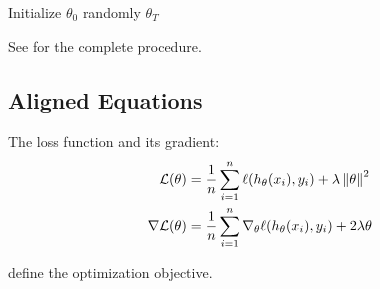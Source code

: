 \begin{algorithm}[H]
\caption{Gradient Descent for Empirical Risk Minimization}
\label{alg:gd}
Initialize $\theta_0$ randomly\;
\Return $\theta_T$\;
\end{algorithm}

See  for the complete procedure.

\subsection{Aligned Equations}

The loss function and its gradient:
\begin{align}
\mathcal{L}(\theta) &= \frac{1}{n} \sum_{i=1}^{n} \ell(h_\theta(x_i), y_i) + \lambda \left\lVert\theta\right\rVert^2 \label{eq:loss} \\
\nabla \mathcal{L}(\theta) &= \frac{1}{n} \sum_{i=1}^{n} \nabla_\theta \ell(h_\theta(x_i), y_i) + 2\lambda\theta \label{eq:grad}
\end{align}

 define the optimization objective.

